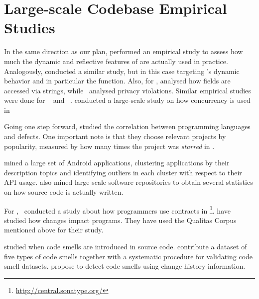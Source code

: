 \section{Large-scale Codebase Empirical Studies}
\label{sec:literature-review:largescale}

In the same direction as our plan,
\cite{callauHowWhyDevelopers2013} performed an empirical study to assess
how much the dynamic and reflective features of \smalltalk{} are actually
used in practice.
Analogously, \cite{richardsAnalysisDynamicBehavior2010,richardsEvalThatMen2011,weiEmpiricalStudyDynamic2016}
conducted a similar study, but in this case targeting \javascript's dynamic
behavior and in particular the  function.
Also, for \javascript{}, \cite{madsenStringAnalysisDynamic2014} analysed
how fields are accessed via strings,
while~\cite{jangEmpiricalStudyPrivacyviolating2010}
analysed privacy violations.
Similar empirical studies were done for
\php{}~\citep{hillsEmpiricalStudyPHP2013,dahseExperienceReportEmpirical2015,doyleEmpiricalStudyEvolution2011}
and \swift{}~\citep{reboucasEmpiricalStudyUsage2016}.
\cite{PINTO201559} conducted a large-scale study on how concurrency is used in \java{}

Going one step forward, \cite{rayLargescaleStudyProgramming2017} studied the correlation between programming languages and defects. 
One important note is that they choose relevant projects by popularity,
measured by how many times the project was \emph{starred} in \github{}.

\cite{gorlaCheckingAppBehavior2014} mined a large set of Android applications, clustering applications by their description topics and identifying outliers in each cluster with respect to their API usage.
\cite{grechanikEmpiricalInvestigationLargescale2010} also mined large scale software repositories to obtain several statistics on how source code is actually written.

For \java{},~\cite{dietrichContractsWildStudy2017a} conducted a study
about how programmers use contracts in \mavencentral{}\footnote{\url{http://central.sonatype.org/}}.
\cite{dietrichBrokenPromisesEmpirical2014} have studied how
\api{} changes impact \java{} programs.
They have used the Qualitas Corpus~\citep{temperoQualitasCorpusCurated2010} mentioned above for their study.

\cite{tufanoWhenWhyYour2015,tufanoWhenWhyYour2017} studied when code
smells are introduced in source code.
\cite{palombaLandfillOpenDataset2015}
contribute a dataset of five types of code smells together with a systematic procedure for validating code smell datasets.
\cite{palombaDetectingBadSmells2013} propose to detect code smells using change history information.

